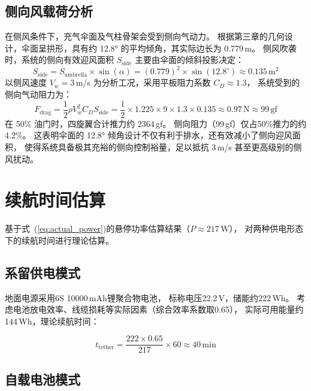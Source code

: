 \subsection{侧向风载荷分析}
在侧风条件下，充气伞面及气柱骨架会受到侧向气动力。
根据第三章的几何设计，伞面呈拱形，具有约 12.8° 的平均倾角，其实际边长为 0.779\,m。
侧风吹袭时，系统的侧向有效迎风面积 $S_{\text{side}}$ 主要由伞面的倾斜投影决定：
\begin{equation}
    S_{\text{side}} = S_{\text{umbrella}} \times \sin(\alpha) = (0.779)^2 \times \sin(12.8^\circ) \approx 0.135\,\text{m}^2
\end{equation}
以侧风速度 $V_w = 3$\,m/s 为分析工况，采用平板阻力系数 $C_D \approx 1.3$，
系统受到的侧向气动阻力为：
\begin{equation}
    F_{\text{drag}} = \frac{1}{2}\rho V_w^2 C_D S_{\text{side}}
                    = \frac{1}{2} \times 1.225 \times 9 \times 1.3 \times 0.135
                    \approx 0.97\,\text{N} \approx 99\,\text{gf}
    \label{eq:drag}
\end{equation}
在 50\% 油门时，四旋翼合计推力约 2364\,gf。
侧向阻力（99\,gf）仅占50\%推力的约 4.2\%。
这表明伞面的 12.8° 倾角设计不仅有利于排水，还有效减小了侧向迎风面积，
使得系统具备极其充裕的侧向控制裕量，足以抵抗 3\,m/s 甚至更高级别的侧风扰动。

\section{续航时间估算}

基于式~(\ref{eq:actual_power})的悬停功率估算结果（$P \approx 217$\,W），
对两种供电形态下的续航时间进行理论估算。

\subsection{系留供电模式}

地面电源采用6S 10000\,mAh锂聚合物电池，
标称电压22.2\,V，储能约222\,Wh。
考虑电池放电效率、线缆损耗等实际因素（综合效率系数取0.65），
实际可用能量约144\,Wh，理论续航时间：

\begin{equation}
    t_{\text{tether}} = \frac{222 \times 0.65}{217} \times 60 \approx 40\,\text{min}
    \label{eq:endurance_tether}
\end{equation}

\subsection{自载电池模式}

